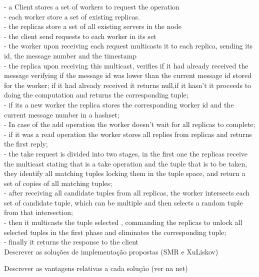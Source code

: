 \documentclass[times, 10pt,two column]{article}
\begin{document}
 - a Client stores a set of workers to request the operation\\
 - each worker store a set of existing replicas.\\
 - the replicas store a set of all existing servers in the node\\
 - the client send requests to each worker in its set\\
 - the worker upon receiving each request multicasts it to each replica, sending its id, the message number and the timestamp\\
 - the replica upon receiving this multicast, verifies if it had already received the message verifying if the message id was lower than the current message id stored for the worker; if it had already received it returns null,if it hasn't it proceeds to doing the computation and returns the corresponding tuple;\\
 - if its a new worker the replica stores the corresponding worker id and the current message number in a hashset;\\
 - In case of the add operation the worker doesn't wait for all replicas to complete;\\
 - if it was a read operation the worker stores all replies from replicas and returns the first reply;\\
 - the take request is divided into two stages, in the first one the replicas receive the multicast stating that is a take operation and the tuple that is to be taken, they identify all matching tuples locking them in the tuple space, and return a set of copies of all matching tuples;\\
 - after receiving all candidate tuples from all replicas, the worker intersects each set of candidate tuple, which can be multiple and then selects a random tuple from that intersection;\\
 - then it multicasts the tuple selected , commanding the replicas to unlock all selected tuples in the first phase and eliminates the corresponding tuple;\\
 - finally it returns the response to the client\\
 

Descrever as solu\c{c}\~oes de implementa\c{c}\~ao propostas (SMR e XuLiskov)

Descrever as vantagens relativas a cada solu\c{c}\~ao (ver na net)
\end{document}
